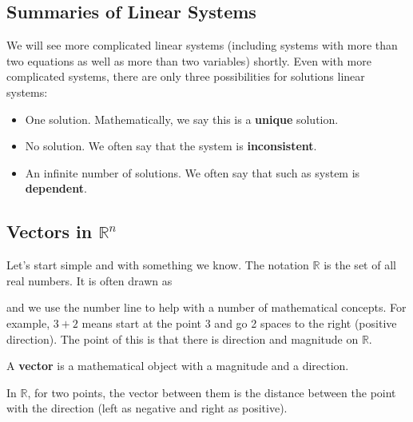\subsection{Summaries of Linear Systems}

We will see more complicated linear systems (including systems with  more than two equations as well as more than two variables) shortly.  Even with more complicated systems, there are only three  possibilities for solutions linear systems:

\begin{itemize}
  \item One solution.  Mathematically, we say this is a \textbf{unique} solution. 
  \item No solution.  We often say that the system is \textbf{inconsistent}. 
  \item An infinite number of solutions.  We often say that such as system is \textbf{dependent}.   
\end{itemize}

\subsection{Vectors in $\mathbb{R}^n$} 

Let's start simple and with something we know.  The notation $\mathbb{R}$ is the set of all real numbers.  It is often drawn as
%
\begin{center}
\end{center}
and we use the number line to help with a number of mathematical concepts.  For example, $3 + 2$ means start at the point $3$ and go 2 spaces to the right (positive direction).  The point of this is that there is direction and magnitude on $\mathbb{R}$.  

\begin{definition}  
A \textbf{vector} is a mathematical object with a magnitude and a direction.  
\end{definition}

In $\mathbb{R}$, for two points, the vector between them is the distance between the point with the direction (left as negative and right as positive).  

